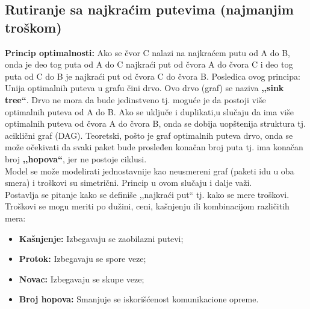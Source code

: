 \documentclass[a4paper]{article}
\begin{document}
    \subsection{Rutiranje sa najkraćim putevima (najmanjim troškom)}
        \textbf{Princip optimalnosti:} Ako se čvor C nalazi na najkraćem putu od A do B, onda
        je deo tog puta od A do C najkraći put od čvora A do čvora C i deo tog puta od C do B 
        je najkraći put od čvora C do čvora B. Posledica ovog principa: Unija optimalnih 
        puteva u grafu čini drvo. Ovo
        drvo (graf) se naziva \textbf{,,sink tree``}. Drvo ne mora da bude jedinstveno tj. moguće je
        da postoji više optimalnih puteva od A do B. Ako se uključe i duplikati,u slučaju
        da ima više optimalnih puteva od čvora A do čvora B, onda se
        dobija uopštenija struktura tj. aciklični graf (DAG). Teoretski, pošto je graf optimalnih 
        puteva drvo, onda se može očekivati da svaki paket bude prosleđen konačan broj puta tj. 
        ima konačan broj \textbf{,,hopova``}, jer ne postoje ciklusi. \\
        \indent Model se može modelirati jednostavnije kao neusmereni graf (paketi idu u oba
        smera) i troškovi su simetrični. Princip u ovom slučaju i dalje važi. \\
        \indent Postavlja se pitanje kako se definiše ,,najkraći put`` tj. kako se mere
        troškovi. Troškovi se mogu meriti po dužini, ceni, kašnjenju ili kombinacijom različitih
        mera:
        \begin{itemize}
            \item \textbf{Kašnjenje:} Izbegavaju se zaobilazni putevi;
            \item \textbf{Protok:} Izbegavaju se spore veze;
            \item \textbf{Novac:} Izbegavaju se skupe veze;
            \item \textbf{Broj hopova:} Smanjuje se iskorišćenost komunikacione opreme.
        \end{itemize}
\end{document}
